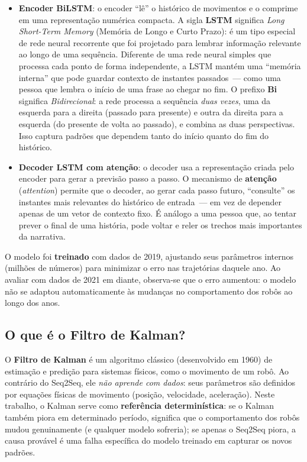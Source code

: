 \documentclass[11pt,a4paper]{article}
\begin{document}
\begin{itemize}[leftmargin=1.4em,itemsep=2pt]
    \item \textbf{Encoder BiLSTM}: o encoder ``l\^e'' o hist\'orico de movimentos e o comprime em uma representa\c{c}\~ao num\'erica compacta. A sigla \textbf{LSTM} significa \emph{Long Short-Term Memory} (Mem\'oria de Longo e Curto Prazo): \'e um tipo especial de rede neural recorrente que foi projetado para lembrar informa\c{c}\~ao relevante ao longo de uma sequ\^encia. Diferente de uma rede neural simples que processa cada ponto de forma independente, a LSTM mant\'em uma ``mem\'oria interna'' que pode guardar contexto de instantes passados~--- como uma pessoa que lembra o in\'icio de uma frase ao chegar no fim. O prefixo \textbf{Bi} significa \emph{Bidirecional}: a rede processa a sequ\^encia \emph{duas vezes}, uma da esquerda para a direita (passado para presente) e outra da direita para a esquerda (do presente de volta ao passado), e combina as duas perspectivas. Isso captura padr\~oes que dependem tanto do in\'icio quanto do fim do hist\'orico.
    \item \textbf{Decoder LSTM com aten\c{c}\~ao}: o decoder usa a representa\c{c}\~ao criada pelo encoder para gerar a previs\~ao passo a passo. O mecanismo de \textbf{aten\c{c}\~ao} (\emph{attention}) permite que o decoder, ao gerar cada passo futuro, ``consulte'' os instantes mais relevantes do hist\'orico de entrada~--- em vez de depender apenas de um vetor de contexto fixo. \'E an\'alogo a uma pessoa que, ao tentar prever o final de uma hist\'oria, pode voltar e reler os trechos mais importantes da narrativa.
\end{itemize}

O modelo foi \textbf{treinado} com dados de 2019, ajustando seus par\^ametros internos (milh\~oes de n\'umeros) para minimizar o erro nas trajet\'orias daquele ano. Ao avaliar com dados de 2021 em diante, observa-se que o erro aumentou: o modelo n\~ao se adaptou automaticamente \`as mudan\c{c}as no comportamento dos rob\^os ao longo dos anos.

\subsection*{O que \'e o Filtro de Kalman?}

O \textbf{Filtro de Kalman} \'e um algoritmo cl\'assico (desenvolvido em 1960) de estima\c{c}\~ao e predi\c{c}\~ao para sistemas f\'isicos, como o movimento de um rob\^o. Ao contr\'ario do Seq2Seq, ele \emph{n\~ao aprende com dados}: seus par\^ametros s\~ao definidos por equa\c{c}\~oes f\'isicas de movimento (posi\c{c}\~ao, velocidade, acelera\c{c}\~ao). Neste trabalho, o Kalman serve como \textbf{refer\^encia determin\'istica}: se o Kalman tamb\'em piora em determinado per\'iodo, significa que o comportamento dos rob\^os mudou genuinamente (e qualquer modelo sofreria); se apenas o Seq2Seq piora, a causa prov\'avel \'e uma falha espec\'ifica do modelo treinado em capturar os novos padr\~oes.
\end{document}
